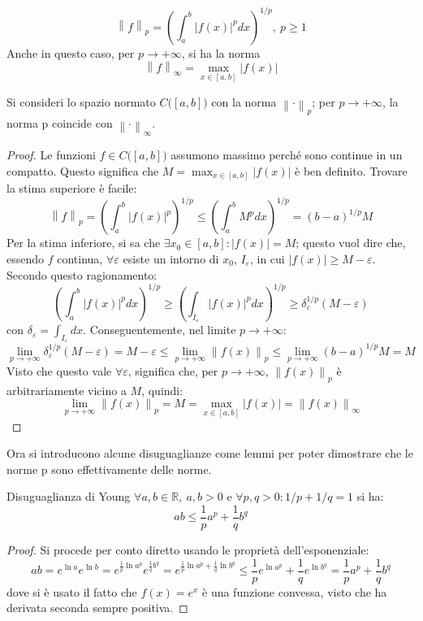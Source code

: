 \documentclass[11pt, a4paper]{scrartcl}
\theoremstyle{definition}
\numberwithin{esempio}{section}
\theoremstyle{definition}
\numberwithin{obs}{section}
\numberwithin{nota}{section}
\numberwithin{equation}{subsection}
\begin{document}
\begin{equation}
	\left\lVert f \right\rVert _p = \left(\int_{a} ^b \lvert f(x) \rvert ^p dx\right) ^{1 / p} , \ p\ge 1
\end{equation}
\noindent Anche in questo caso, per $p\to +\infty$, si ha la norma
\begin{equation}
	\left\lVert f \right\rVert _\infty= \max _{x \in [a,b]}  \lvert f(x) \rvert 
\end{equation}
\begin{prop}
	{}{}
	Si consideri lo spazio normato $C\big([a,b]\big)$ con la norma $\left\lVert \cdot   \right\rVert _p$; per $p\to +\infty$, la norma p coincide con $\left\lVert \cdot  \right\rVert _\infty$.
	\begin{proof}
		Le funzioni $f \in C\big([a,b]\big)$ assumono massimo perch\'e sono continue in un compatto. 
		Questo significa che $M = \displaystyle \max_{x \in [a,b]} \lvert f(x) \rvert $ \`e ben definito.
		Trovare la stima superiore \`e facile:
		\begin{equation*}
			\left\lVert f \right\rVert _p = \left(\int_{a} ^b \lvert f(x) \rvert ^p\right) ^{1 / p} \le \left(\int_{a} ^b M^p dx \right) ^{1/p}  = (b-a)^{1/p} M
		\end{equation*}
		Per la stima inferiore, si sa che $\exists x_0 \in [a,b]:\lvert f(x) \rvert = M$; questo vuol dire che, essendo $f$ continua, $\forall \varepsilon $ esiste un intorno di $x_0$, $I_\varepsilon $, in cui $\lvert f(x) \rvert \ge M-\varepsilon $.
		Secondo questo ragionamento:
		\[
		\left(\int_{a} ^b \lvert f(x) \rvert^{p}  dx\right) ^{1/p} \ge \left(\int_{I_\varepsilon } \lvert f(x) \rvert ^p dx\right) ^{1 / p} \ge \delta _\varepsilon ^{1 / p} (M-\varepsilon )
		\] 
		con $\delta _\varepsilon = \int_{I_\varepsilon } dx$.
		Conseguentemente, nel limite $p\to +\infty$:
		\[
		\lim_{p \to +\infty} \delta _\varepsilon ^{1/p} (M-\varepsilon ) = M-\varepsilon \le \lim_{p \to +\infty} \left\lVert f(x) \right\rVert _p \le \lim_{p \to +\infty} (b-a)^{1 / p} M= M
		\] 
		Visto che questo vale $\forall \varepsilon $, significa che, per $p\to +\infty$, $\left\lVert f(x) \right\rVert _p$ \`e arbitrariamente vicino a $M$, quindi:
		\[
			\lim_{p \to +\infty} \left\lVert f(x) \right\rVert _p = M = \max_{x \in [a,b]} \lvert f(x) \rvert = \left\lVert f(x) \right\rVert _\infty
		\] 
	\end{proof}
\end{prop}
Ora si introducono alcune disuguaglianze come lemmi per poter dimostrare che le norme p sono effettivamente delle norme.
\begin{lemma}
	{Disuguaglianza di Young}{}
	$\forall a,b \in \mathbb{R}, \ a,b>0$ e $\forall p,q>0 : 1 / p + 1 / q = 1$ si ha:
	\[
	ab \le \frac{1}{p}a^p + \frac{1}{q}b^q
	\] 
	\begin{proof}
		Si procede per conto diretto usando le propriet\`a dell'esponenziale:
		\[
				ab = e^{\ln a} e^{\ln b} = e^{\frac{1}{p} \ln a^p} e^{\frac{1}{q} b^q} = e^{\frac{1}{p}\ln a^p + \frac{1}{q} \ln b^q} \le \frac{1}{p}e^{\ln a^p} + \frac{1}{q} e^{\ln b^q}= \frac{1}{p}a^p + \frac{1}{q}b^q
		\] 
		dove si \`e usato il fatto che $f(x) = e^x$ \`e una funzione convessa, visto che ha derivata seconda sempre positiva.
	\end{proof}
\end{lemma}
\end{document}
